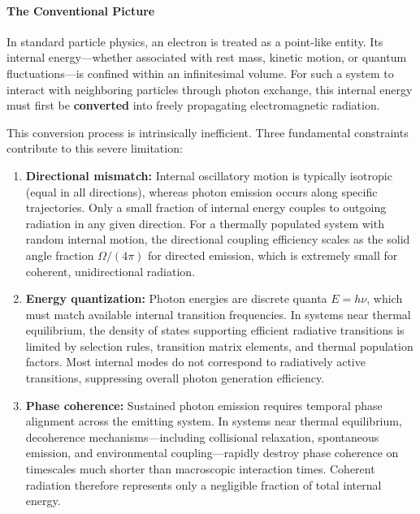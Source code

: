 \documentclass[12pt,letterpaper]{article}
\begin{document}
\paragraph{The Conventional Picture}

In standard particle physics, an electron is treated as a point-like entity. Its internal energy—whether associated with rest mass, kinetic motion, or quantum fluctuations—is confined within an infinitesimal volume. For such a system to interact with neighboring particles through photon exchange, this internal energy must first be \textbf{converted} into freely propagating electromagnetic radiation.

This conversion process is intrinsically inefficient. Three fundamental constraints contribute to this severe limitation:

\begin{enumerate}
\item \textbf{Directional mismatch:} Internal oscillatory motion is typically isotropic (equal in all directions), whereas photon emission occurs along specific trajectories. Only a small fraction of internal energy couples to outgoing radiation in any given direction. For a thermally populated system with random internal motion, the directional coupling efficiency scales as the solid angle fraction $\Omega/(4\pi)$ for directed emission, which is extremely small for coherent, unidirectional radiation.

\item \textbf{Energy quantization:} Photon energies are discrete quanta $E = h\nu$, which must match available internal transition frequencies. In systems near thermal equilibrium, the density of states supporting efficient radiative transitions is limited by selection rules, transition matrix elements, and thermal population factors. Most internal modes do not correspond to radiatively active transitions, suppressing overall photon generation efficiency.

\item \textbf{Phase coherence:} Sustained photon emission requires temporal phase alignment across the emitting system. In systems near thermal equilibrium, decoherence mechanisms—including collisional relaxation, spontaneous emission, and environmental coupling—rapidly destroy phase coherence on timescales much shorter than macroscopic interaction times. Coherent radiation therefore represents only a negligible fraction of total internal energy.
\end{enumerate}
\end{document}
